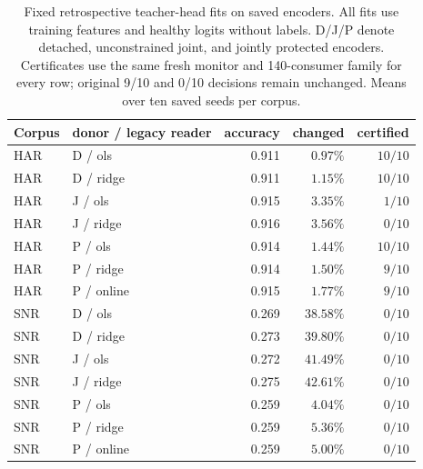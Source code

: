 \begin{table}[htbp]
\centering
\caption{Fixed retrospective teacher-head fits on saved encoders. All fits use training features and healthy logits without labels. D/J/P denote detached, unconstrained joint, and jointly protected encoders. Certificates use the same fresh monitor and 140-consumer family for every row; original 9/10 and 0/10 decisions remain unchanged. Means over ten saved seeds per corpus.}
\label{tab:protected_audit}
\footnotesize
\begin{tabular}{llrrr}
\toprule
Corpus & donor / legacy reader & accuracy & changed & certified \\
\midrule
HAR & D / ols & 0.911 & $0.97\%$ & $10/10$ \\
HAR & D / ridge & 0.911 & $1.15\%$ & $10/10$ \\
HAR & J / ols & 0.915 & $3.35\%$ & $1/10$ \\
HAR & J / ridge & 0.916 & $3.56\%$ & $0/10$ \\
HAR & P / ols & 0.914 & $1.44\%$ & $10/10$ \\
HAR & P / ridge & 0.914 & $1.50\%$ & $9/10$ \\
HAR & P / online & 0.915 & $1.77\%$ & $9/10$ \\
\midrule
SNR & D / ols & 0.269 & $38.58\%$ & $0/10$ \\
SNR & D / ridge & 0.273 & $39.80\%$ & $0/10$ \\
SNR & J / ols & 0.272 & $41.49\%$ & $0/10$ \\
SNR & J / ridge & 0.275 & $42.61\%$ & $0/10$ \\
SNR & P / ols & 0.259 & $4.04\%$ & $0/10$ \\
SNR & P / ridge & 0.259 & $5.36\%$ & $0/10$ \\
SNR & P / online & 0.259 & $5.00\%$ & $0/10$ \\
\bottomrule
\end{tabular}
\end{table}
